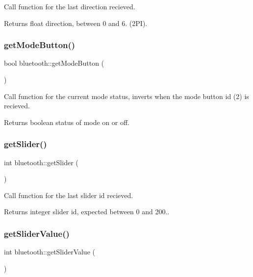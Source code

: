 Call function for the last direction recieved. 

\begin{DoxyReturn}{Returns}
float direction, between 0 and 6. ({\ttfamily 2PI}). 
\end{DoxyReturn}
\mbox{\label{classbluetooth_a3f58d644d4b2c7a4ac07e8e0ec5c2f9d}} 
\subsubsection{\texorpdfstring{getModeButton()}{getModeButton()}}
{\footnotesize\ttfamily bool bluetooth\+::get\+Mode\+Button (\begin{DoxyParamCaption}{ }\end{DoxyParamCaption})}



Call function for the current mode status, inverts when the mode button id (2) is recieved. 

\begin{DoxyReturn}{Returns}
boolean status of mode on or off. 
\end{DoxyReturn}
\mbox{\label{classbluetooth_af74bf7e384aa7fee418ef4e644d53794}} 
\subsubsection{\texorpdfstring{getSlider()}{getSlider()}}
{\footnotesize\ttfamily int bluetooth\+::get\+Slider (\begin{DoxyParamCaption}{ }\end{DoxyParamCaption})}



Call function for the last slider id recieved. 

\begin{DoxyReturn}{Returns}
integer slider id, expected between 0 and 200.. 
\end{DoxyReturn}
\mbox{\label{classbluetooth_aa888eeb5fd739339e93aa55d9a081a58}} 
\subsubsection{\texorpdfstring{getSliderValue()}{getSliderValue()}}
{\footnotesize\ttfamily int bluetooth\+::get\+Slider\+Value (\begin{DoxyParamCaption}{ }\end{DoxyParamCaption})}



